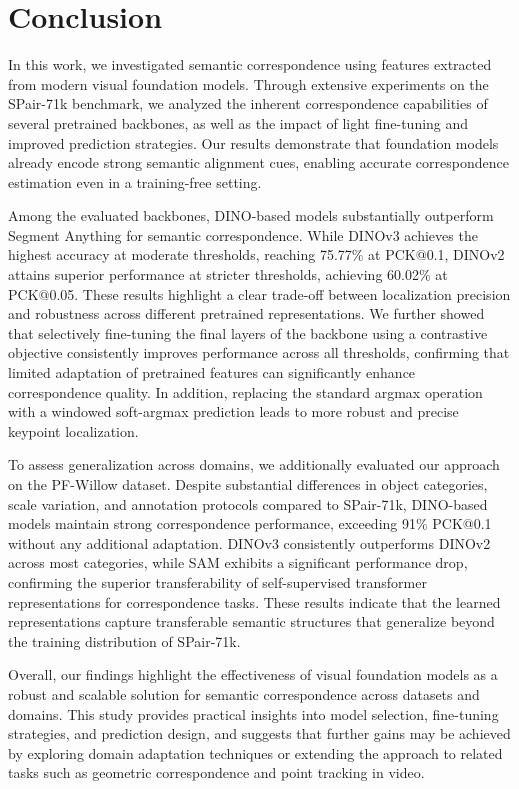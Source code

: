 \section{Conclusion}
\label{sec:conclusion}

In this work, we investigated semantic correspondence using features extracted from modern visual foundation models. Through extensive experiments
on the SPair-71k benchmark, we analyzed the inherent correspondence capabilities of several pretrained backbones, as well as the impact of light
fine-tuning and improved prediction strategies. Our results demonstrate that foundation models already encode strong semantic alignment cues,
enabling accurate correspondence estimation even in a training-free setting.

Among the evaluated backbones, DINO-based models substantially outperform Segment Anything for semantic correspondence. While DINOv3 achieves the
highest accuracy at moderate thresholds, reaching 75.77\% at PCK@0.1, DINOv2 attains superior performance at stricter thresholds, achieving 60.02\% at
PCK@0.05. These results highlight a clear trade-off between localization precision and robustness across different pretrained representations.
We further showed that selectively fine-tuning the final layers of the backbone using a contrastive objective consistently improves performance
across all thresholds, confirming that limited adaptation of pretrained features can significantly enhance correspondence quality. In addition,
replacing the standard argmax operation with a windowed soft-argmax prediction leads to more robust and precise keypoint localization.

To assess generalization across domains, we additionally evaluated our approach on the PF-Willow dataset.
Despite substantial differences in object categories, scale variation, and annotation protocols compared to SPair-71k,
DINO-based models maintain strong correspondence performance, exceeding 91\% PCK@0.1 without any additional adaptation.
DINOv3 consistently outperforms DINOv2 across most categories, while SAM exhibits a significant performance drop,
confirming the superior transferability of self-supervised transformer representations for correspondence tasks.
These results indicate that the learned representations capture transferable semantic structures that generalize beyond the training distribution of SPair-71k.

Overall, our findings highlight the effectiveness of visual foundation models as a robust and scalable solution for semantic correspondence across
datasets and domains. This study provides practical insights into model selection, fine-tuning strategies, and prediction design, and suggests that
further gains may be achieved by exploring domain adaptation techniques or extending the approach to related tasks such as geometric correspondence
and point tracking in video.


